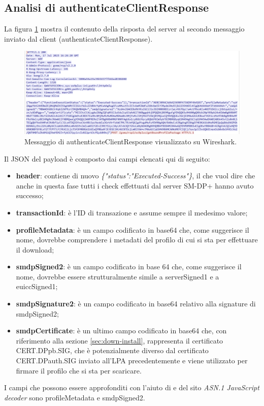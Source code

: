 \documentclass[10pt, oneside]{book}
\begin{document}
\subsection{Analisi di authenticateClientResponse}
La figura \ref{fig:msg4-stream-pcap} mostra il contenuto della risposta del server al secondo messaggio inviato dal client (authenticateClientResponse).\\
\begin{figure}
\includegraphics[width=\linewidth]{msg4-stream-pcap.png}
\caption{Messaggio di authenticateClientResponse visualizzato su Wireshark.}
\label{fig:msg4-stream-pcap}
\end{figure}
Il JSON del payload è composto dai campi elencati qui di seguito:
\begin{itemize}
\item \textbf{header}: contiene di nuovo \textit{\{"status":"Executed-Success"\}}, il che vuol dire che anche in questa fase tutti i check effettuati dal server SM-DP+ hanno avuto successo;
\item \textbf{transactionId}: è l'ID di transazione e assume sempre il medesimo valore;
\item \textbf{profileMetadata}: è un campo codificato in base64 che, come suggerisce il nome, dovrebbe comprendere i metadati del profilo di cui si sta per effettuare il download;
\item \textbf{smdpSigned2}: è un campo codificato in base 64 che, come suggerisce il nome, dovrebbe essere strutturalmente simile a serverSigned1 e a euiccSigned1;
\item \textbf{smdpSignature2}: è un campo codificato in base64 relativo alla signature di smdpSigned2;
\item \textbf{smdpCertificate}: è un ultimo campo codificato in base64 che, con riferimento alla sezione \ref{sec:down-install}, rappresenta il certificato CERT.DPpb.SIG, che è potenzialmente diverso dal certificato CERT.DPauth.SIG inviato all'LPA precedentemente e viene utilizzato per firmare il profilo che si sta per scaricare.
\end{itemize}
I campi che possono essere approfonditi con l'aiuto di \cite{RSP-definitions} e del sito \textit{ASN.1 JavaScript decoder} sono profileMetadata e smdpSigned2.\\
\end{document}
